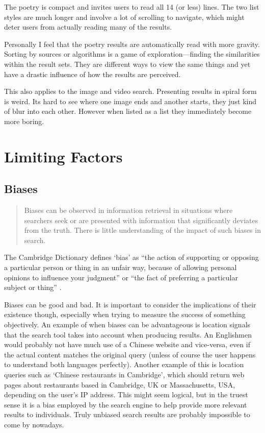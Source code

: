 The poetry is compact and invites users to read all \num{14} (or less) lines. The two list styles are much longer and involve a lot of scrolling to navigate, which might deter users from actually reading many of the results.

Personally I feel that the poetry results are automatically read with more gravity. Sorting by sources or algorithms is a game of exploration---finding the similarities within the result sets. They are different ways to view the same things and yet have a drastic influence of how the results are perceived. 

This also applies to the image and video search. Presenting results in spiral form is weird. Its hard to see where one image ends and another starts, they just kind of blur into each other. However when listed as a list they immediately become more boring.


\section{Limiting Factors}


\subsection{Biases}

\begin{quotation}
  Biases can be observed in information retrieval in situations where searchers seek or are presented with information that significantly deviates from the truth. There is little understanding of the impact of such biases in search. 
\end{quotation}

The Cambridge Dictionary defines `bias' as ``the action of supporting or opposing a particular person or thing in an unfair way, because of allowing personal opinions to influence your judgment'' or ``the fact of preferring a particular subject or thing'' \autocite*{CamDict}.

Biases can be good and bad. It is important to consider the implications of their existence though, especially when trying to measure the success of something objectively. An example of when biases can be advantageous is location signals that the search tool takes into account when producing results. An Englishmen would probably not have much use of a Chinese website and vice-versa, even if the actual content matches the original query (unless of course the user happens to understand both languages perfectly). Another example of this is location queries such as `Chinese restaurants in Cambridge', which should return web pages about restaurants based in Cambridge, UK or Massachusetts, USA, depending on the user's IP address.  This might seem logical, but in the truest sense it is a bias employed by the search engine to help provide more relevant results to individuals. Truly unbiased search results are probably impossible to come by nowadays.

